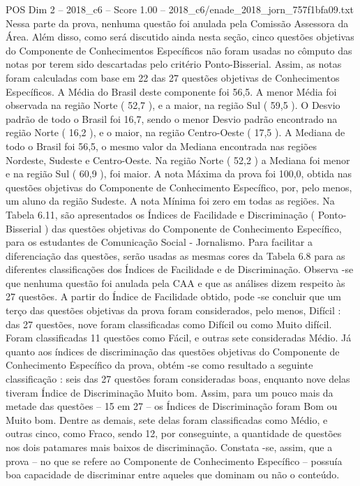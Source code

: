 \begin{textsample}{POS Dim 2 – 2018\_c6 – Score 1.00 – 2018\_c6/enade\_2018\_jorn\_757f1bfa09.txt}
Nessa parte da prova, nenhuma questão foi anulada pela Comissão Assessora da Área.
Além disso, como será discutido ainda nesta seção, cinco questões objetivas do Componente de Conhecimentos Específicos não foram usadas no cômputo das notas por terem sido descartadas pelo critério Ponto-Bisserial.
Assim, as notas foram calculadas com base em 22 das 27 questões objetivas de Conhecimentos Específicos.
A Média do Brasil deste componente foi 56,5.
A menor Média foi observada na região Norte ( 52,7 ), e a maior, na região Sul ( 59,5 ).
O Desvio padrão de todo o Brasil foi 16,7, sendo o menor Desvio padrão encontrado na região Norte ( 16,2 ), e o maior, na região Centro-Oeste ( 17,5 ).
A Mediana de todo o Brasil foi 56,5, o mesmo valor da Mediana encontrada nas regiões Nordeste, Sudeste e Centro-Oeste.
Na região Norte ( 52,2 ) a Mediana foi menor e na região Sul ( 60,9 ), foi maior.
A nota Máxima da prova foi 100,0, obtida nas questões objetivas do Componente de Conhecimento Específico, por, pelo menos, um aluno da região Sudeste.
A nota Mínima foi zero em todas as regiões.
Na Tabela 6.11, são apresentados os Índices de Facilidade e Discriminação ( Ponto-Bisserial ) das questões objetivas do Componente de Conhecimento Específico, para os estudantes de Comunicação Social - Jornalismo.
Para facilitar a diferenciação das questões, serão usadas as mesmas cores da Tabela 6.8 para as diferentes classificações dos Índices de Facilidade e de Discriminação.
Observa -se que nenhuma questão foi anulada pela CAA e que as análises dizem respeito às 27 questões.
A partir do Índice de Facilidade obtido, pode -se concluir que um terço das questões objetivas da prova foram considerados, pelo menos, Difícil : das 27 questões, nove foram classificadas como Difícil ou como Muito difícil.
Foram classificadas 11 questões como Fácil, e outras sete consideradas Médio.
Já quanto aos índices de discriminação das questões objetivas do Componente de Conhecimento Específico da prova, obtém -se como resultado a seguinte classificação : seis das 27 questões foram consideradas boas, enquanto nove delas tiveram Índice de Discriminação Muito bom.
Assim, para um pouco mais da metade das questões – 15 em 27 – os Índices de Discriminação foram Bom ou Muito bom.
Dentre as demais, sete delas foram classificadas como Médio, e outras cinco, como Fraco, sendo 12, por conseguinte, a quantidade de questões nos dois patamares mais baixos de discriminação.
Constata -se, assim, que a prova – no que se refere ao Componente de Conhecimento Específico – possuía boa capacidade de discriminar entre aqueles que dominam ou não o conteúdo.

\end{textsample}
